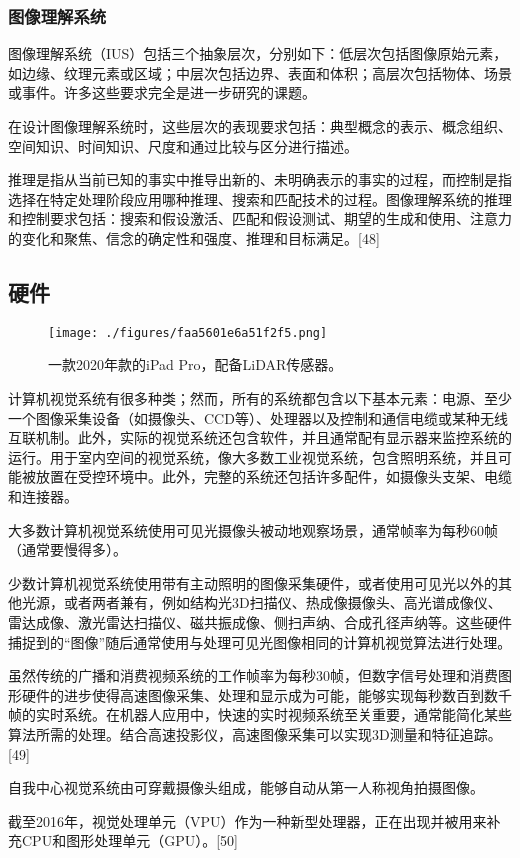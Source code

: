 \subsubsection{图像理解系统}  
图像理解系统（IUS）包括三个抽象层次，分别如下：低层次包括图像原始元素，如边缘、纹理元素或区域；中层次包括边界、表面和体积；高层次包括物体、场景或事件。许多这些要求完全是进一步研究的课题。

在设计图像理解系统时，这些层次的表现要求包括：典型概念的表示、概念组织、空间知识、时间知识、尺度和通过比较与区分进行描述。

推理是指从当前已知的事实中推导出新的、未明确表示的事实的过程，而控制是指选择在特定处理阶段应用哪种推理、搜索和匹配技术的过程。图像理解系统的推理和控制要求包括：搜索和假设激活、匹配和假设测试、期望的生成和使用、注意力的变化和聚焦、信念的确定性和强度、推理和目标满足。[48]
\subsection{硬件}
\begin{figure}[ht]
\centering
\texttt{[image: ./figures/faa5601e6a51f2f5.png]}
\caption{一款2020年款的iPad Pro，配备LiDAR传感器。} \label{fig_JSJ_9}
\end{figure}
计算机视觉系统有很多种类；然而，所有的系统都包含以下基本元素：电源、至少一个图像采集设备（如摄像头、CCD等）、处理器以及控制和通信电缆或某种无线互联机制。此外，实际的视觉系统还包含软件，并且通常配有显示器来监控系统的运行。用于室内空间的视觉系统，像大多数工业视觉系统，包含照明系统，并且可能被放置在受控环境中。此外，完整的系统还包括许多配件，如摄像头支架、电缆和连接器。

大多数计算机视觉系统使用可见光摄像头被动地观察场景，通常帧率为每秒60帧（通常要慢得多）。

少数计算机视觉系统使用带有主动照明的图像采集硬件，或者使用可见光以外的其他光源，或者两者兼有，例如结构光3D扫描仪、热成像摄像头、高光谱成像仪、雷达成像、激光雷达扫描仪、磁共振成像、侧扫声纳、合成孔径声纳等。这些硬件捕捉到的“图像”随后通常使用与处理可见光图像相同的计算机视觉算法进行处理。

虽然传统的广播和消费视频系统的工作帧率为每秒30帧，但数字信号处理和消费图形硬件的进步使得高速图像采集、处理和显示成为可能，能够实现每秒数百到数千帧的实时系统。在机器人应用中，快速的实时视频系统至关重要，通常能简化某些算法所需的处理。结合高速投影仪，高速图像采集可以实现3D测量和特征追踪。[49]

自我中心视觉系统由可穿戴摄像头组成，能够自动从第一人称视角拍摄图像。

截至2016年，视觉处理单元（VPU）作为一种新型处理器，正在出现并被用来补充CPU和图形处理单元（GPU）。[50]
